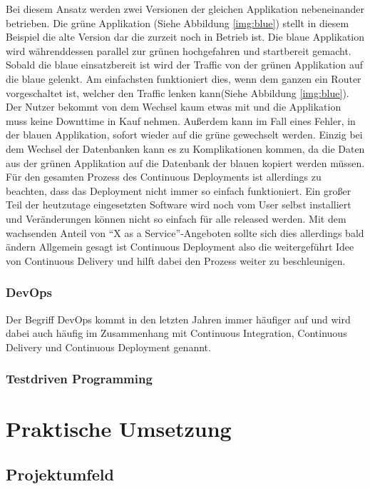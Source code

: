 Bei diesem Ansatz werden zwei Versionen der gleichen Applikation nebeneinander betrieben. Die grüne Applikation (Siehe Abbildung \ref{img:blue}) stellt in diesem Beispiel die alte Version dar die zurzeit noch in Betrieb ist. Die blaue Applikation wird währenddessen parallel zur grünen hochgefahren und startbereit gemacht. Sobald die blaue einsatzbereit ist wird der Traffic von der grünen Applikation auf die blaue gelenkt. Am einfachsten funktioniert dies, wenn dem ganzen ein Router vorgeschaltet ist, welcher den Traffic lenken kann(Siehe Abbildung \ref{img:blue}).\autocite[Vgl.][S.407]{Farley.2010} Der Nutzer bekommt von dem Wechsel kaum etwas mit und die Applikation muss keine Downttime in Kauf nehmen. Außerdem kann im Fall eines Fehler, in der blauen Applikation, sofort wieder auf die grüne gewechselt werden. Einzig bei dem Wechsel der Datenbanken kann es zu Komplikationen kommen, da die Daten aus der grünen Applikation auf die Datenbank der blauen kopiert werden müssen.\autocite[Vgl.][S.407]{Farley.2010}\\  
Für den gesamten Prozess des Continuous Deployments ist allerdings zu beachten, dass das Deployment nicht immer so einfach funktioniert. Ein großer Teil der heutzutage eingesetzten Software wird noch vom User selbst installiert und Veränderungen können nicht so einfach für alle released werden. Mit dem wachsenden Anteil von \enquote{X as a Service}-Angeboten\autocite[S.18]{Stahl.2018} sollte sich dies allerdings bald ändern\autocite[Vgl.][S.18]{Stahl.2018} Allgemein gesagt ist Continuous Deployment also die weitergeführt Idee von Continuous Delivery und hilft dabei den Prozess weiter zu beschleunigen.
\subsection{DevOps}
Der Begriff DevOps kommt in den letzten Jahren immer häufiger auf\autocite{Sauce.2018} und wird dabei auch häufig im Zusammenhang mit Continuous Integration, Continuous Delivery und Continuous Deployment genannt.
\subsection{Testdriven Programming}  
\chapter{Praktische Umsetzung}
\section{Projektumfeld}
